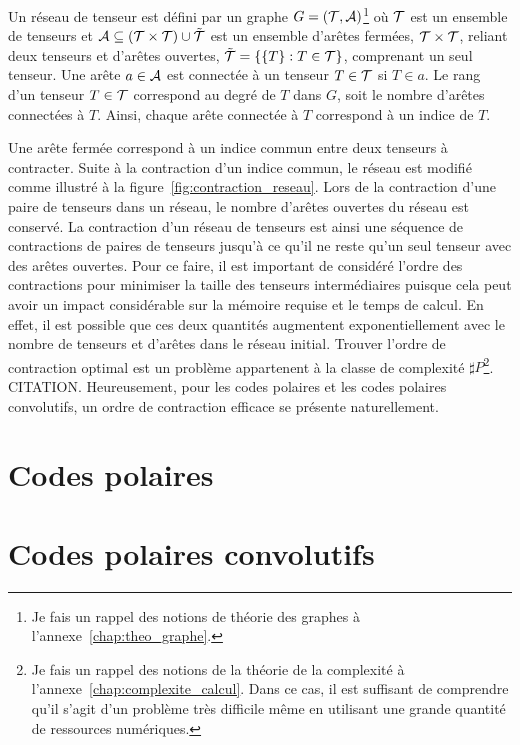Un réseau de tenseur est défini par un graphe $G = (\mathcal{T}, \mathcal{A})$\footnote{Je fais 
un rappel des notions de théorie des graphes à l'annexe~\ref{chap:theo_graphe}.} où $\mathcal{T}$ 
est un ensemble de tenseurs et $\mathcal{A} \subseteq (\mathcal{T} \times \mathcal{T}) \cup \tilde{\mathcal{T}}$ 
est un ensemble d'arêtes fermées, $\mathcal{T} \times \mathcal{T}$, reliant deux tenseurs 
et d'arêtes ouvertes, $\tilde {\mathcal{T}} = \qty{\qty{T} : T \in \mathcal{T}}$, comprenant un seul tenseur.
Une arête $a \in \mathcal{A}$ est connectée à un tenseur $T \in \mathcal{T}$ si $T \in a$.
Le rang d'un tenseur $T \in \mathcal{T}$ correspond au degré de $T$ dans $G$,
soit le nombre d'arêtes connectées à $T$.
Ainsi, chaque arête connectée à $T$ correspond à un indice de $T$.

Une arête fermée correspond à un indice commun entre deux tenseurs à contracter.
Suite à la contraction d'un indice commun, le réseau est modifié comme 
illustré à la figure~\ref{fig:contraction_reseau}.
Lors de la contraction d'une paire de tenseurs dans un réseau,
le nombre d'arêtes ouvertes du réseau est conservé.
La contraction d'un réseau de tenseurs est ainsi une séquence de contractions 
de paires de tenseurs jusqu'à ce qu'il ne reste qu'un seul tenseur avec des arêtes ouvertes.
Pour ce faire, 
il est important de considéré l'ordre des contractions pour minimiser la taille 
des tenseurs intermédiaires puisque cela peut avoir un impact considérable sur la mémoire
requise et le temps de calcul.
En effet,
il est possible que ces deux quantités augmentent exponentiellement avec le nombre 
de tenseurs et d'arêtes dans le réseau initial.
Trouver l'ordre de contraction optimal est un problème appartenent 
à la classe de complexité $\sharp P$\footnote{Je fais un rappel des notions de la 
théorie de la complexité à l'annexe~\ref{chap:complexite_calcul}. Dans ce cas, 
il est suffisant de comprendre qu'il s'agit d'un problème très difficile même 
en utilisant une grande quantité de ressources numériques.}. CITATION.
Heureusement,
pour les codes polaires et les codes polaires convolutifs,
un ordre de contraction efficace se présente naturellement.


\section{Codes polaires}
\label{sec:codes_polaires}

\section{Codes polaires convolutifs}
\label{sec:codes_polaires_conv}

